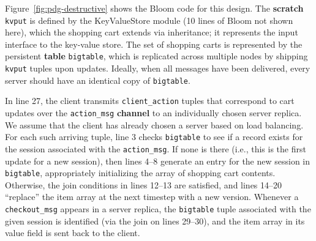 Figure~\ref{fig:pdg-destructive} shows the Bloom code for this design.  The
\textbf{scratch} \texttt{kvput} is defined by the KeyValueStore module (10
lines of Bloom not shown here), which the shopping cart extends via
inheritance; it represents the input interface to the key-value store.
The set of shopping carts is represented by the persistent \textbf{table} \texttt{bigtable}, which is replicated across multiple nodes  
by shipping \texttt{kvput} tuples upon updates. 
Ideally, when all messages have been delivered, every server should have an 
identical copy of \texttt{bigtable}.

In line 27, the client transmits \texttt{client\_action} tuples that correspond to cart
updates over the \texttt{action\_msg} \textbf{channel} to an individually
chosen server replica.  We assume that the client has already chosen a server
based on load balancing.
For each such arriving
tuple, line 3
checks \texttt{bigtable} to see if a record exists for the
session associated with the \texttt{action\_msg}.  If none is there (i.e., this
is the first update for a new session), then lines 4--8 generate an entry for
the new session in \texttt{bigtable}, appropriately initializing the array of
shopping cart contents.  Otherwise, the join conditions in lines 12--13 are
satisfied, and lines 14--20 ``replace'' the item array
at the next timestep with a new version.  
Whenever a \texttt{checkout\_msg} appears in a server replica, the 
\texttt{bigtable} tuple associated with the given session is identified (via the join
on lines 29--30), and the item array in its value field is sent back to the client.  


